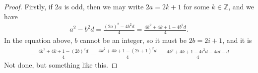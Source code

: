 \begin{proof}
    Firstly, if \(2a\) is odd, then we may write \(2a = 2k + 1\) for some \(k \in \mathbb{Z}\), and we have
    \begin{align*}
        a^2 - b^2 d = \frac{(2a)^2 - 4 b^2d}{4} = \frac{4k^2 + 4k + 1 - 4b^2 d}{4} \text{.}
    \end{align*}
    In the equation above, \(b\) cannot be an integer, so it must be \(2b = 2i + 1\), and it is
    \begin{align*}
        = \frac{4k^2 + 4k + 1 - (2b)^2 d}{4} = \frac{4k^2 + 4k + 1 - (2i + 1)^2 d}{4} = \frac{4k^2 + 4k + 1 - 4i^2d - 4id - d}{4}
    \end{align*}
    Not done, but something like this.
\end{proof}